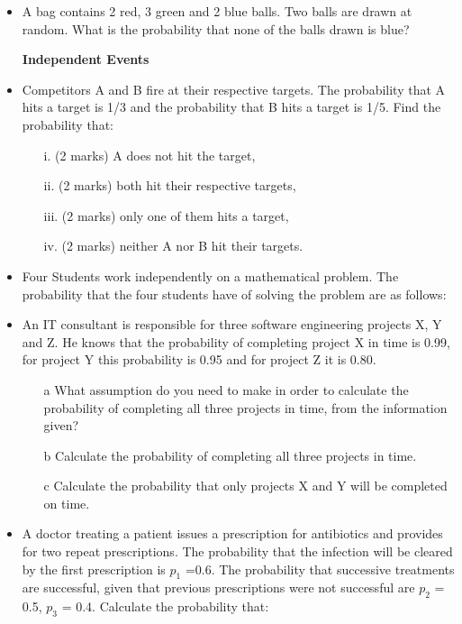 \documentclass[12pt]{report}
\begin{document}
\begin{itemize}	
	\item A bag contains 2 red, 3 green and 2 blue balls. Two balls are drawn at random. What is the probability that none of the balls drawn is blue?
	
	
	
	\bigskip 
	\textbf{Independent Events}
	\item Competitors A and B fire at their respective targets. The probability that A hits a target is 1/3 and the probability that B hits a target is 1/5. Find the probability that:
	\begin{itemize}
		\item[i.] (2 marks) A does not hit the target,
		\item[ii.](2 marks)  both hit their respective targets,
		\item[iii.](2 marks)  only one of them hits a target,
		\item[iv.](2 marks) neither A nor B hit their targets.
	\end{itemize}
	
	\item Four Students work independently on a mathematical problem. The probability that the four students have of solving the problem are as follows:
	\item An IT consultant is responsible for three software engineering projects X, Y and Z.
	He knows that the probability of completing project X in time is 0.99, for project Y this probability is 0.95
	and for project Z it is 0.80.
	
	\begin{itemize}
		\item[a] What assumption do you need to make in order to calculate the probability
		of completing all three projects in time, from the information given?
		\item[b] Calculate the probability of completing all three projects in time.
		\item[c] Calculate the probability that only projects X and Y will be completed on time.
	\end{itemize}
	
	\item A doctor treating a patient issues a prescription for antibiotics and provides for two repeat prescriptions. The probability that the infection will be cleared by the first prescription is $p_1$ =0.6.
	The probability that successive treatments are successful, given that previous prescriptions were not successful are $p_2$ = 0.5, $p_3$ = 0.4. Calculate the probability that:
	

\end{itemize}
\end{document}
